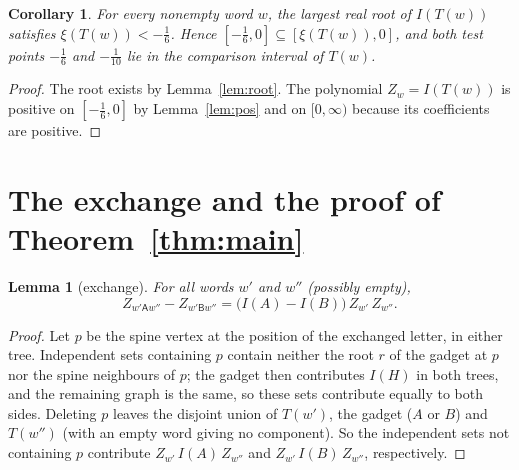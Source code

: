 \documentclass[11pt]{article}
\newtheorem{lemma}{Lemma}
\newtheorem{corollary}{Corollary}
\theoremstyle{definition}
\theoremstyle{remark}
\newcommand{\sA}{\mathsf A}
\newcommand{\sB}{\mathsf B}
\begin{document}
\begin{corollary}\label{cor:interval}
For every nonempty word $w$, the largest real root of $I(T(w))$ satisfies
$\xi(T(w))<-\frac16$. Hence $[-\frac16,0]\subseteq[\xi(T(w)),0]$, and both
test points $-\frac16$ and $-\frac1{10}$ lie in the comparison interval of
$T(w)$.
\end{corollary}

\begin{proof}
The root exists by Lemma~\ref{lem:root}. The polynomial $Z_w=I(T(w))$ is
positive on $[-\frac16,0]$ by Lemma~\ref{lem:pos} and on $[0,\infty)$ because
its coefficients are positive.
\end{proof}

\section{The exchange and the proof of Theorem~\ref{thm:main}}\label{sec:proof}

\begin{lemma}[exchange]\label{lem:swap}
For all words $w'$ and $w''$ (possibly empty),
\[
Z_{w'\sA w''}-Z_{w'\sB w''}=\bigl(I(A)-I(B)\bigr)\,Z_{w'}\,Z_{w''} .
\]
\end{lemma}

\begin{proof}
Let $p$ be the spine vertex at the position of the exchanged letter, in either
tree. Independent sets containing $p$ contain neither the root $r$ of the
gadget at $p$ nor the spine neighbours of $p$; the gadget then contributes
$I(H)$ in both trees, and the remaining graph is the same, so these sets
contribute equally to both sides. Deleting $p$ leaves the disjoint union of
$T(w')$, the gadget ($A$ or $B$) and $T(w'')$ (with an empty word giving no
component). So the independent sets not containing $p$ contribute
$Z_{w'}\,I(A)\,Z_{w''}$ and $Z_{w'}\,I(B)\,Z_{w''}$, respectively.
\end{proof}
\end{document}
